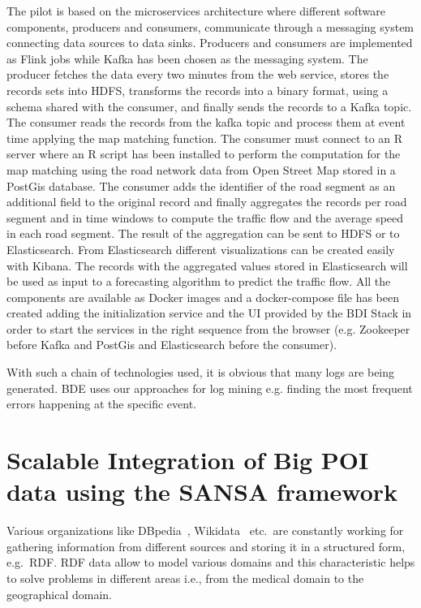 The pilot is based on the microservices architecture where different software components, producers and consumers, communicate through a messaging system connecting data sources to data sinks.
Producers and consumers are implemented as Flink jobs while Kafka has been chosen as the messaging system.
The producer fetches the data every two minutes from the web service, stores the records sets into \gls{HDFS}, transforms the records into a binary format, using a schema shared with the consumer, and finally sends the records to a Kafka topic. 
The consumer reads the records from the kafka topic and process them at event time applying the map matching function. 
The consumer must connect to an R server where an R script has been installed to perform the computation for the map matching using the road network data from Open Street Map stored in a PostGis database. 
The consumer adds the identifier of the road segment as an additional field to the original record and finally aggregates the records per road segment and in time windows to compute the traffic flow and the average speed in each road segment. 
The result of the aggregation can be sent to \gls{HDFS} or to Elasticsearch. 
From Elasticsearch different visualizations can be created easily with Kibana. 
The records with the aggregated values stored in Elasticsearch will be used as input to a forecasting algorithm to predict the traffic flow. 
All the components are available as Docker images and a docker-compose file has been created adding the initialization service and the UI provided by the BDI Stack in order to start the services in the right sequence from the browser (e.g. Zookeeper before Kafka and PostGis and Elasticsearch before the consumer).

With such a chain of technologies used, it is obvious that many logs are being generated.
BDE uses our approaches for log mining e.g. finding the most frequent errors happening at the specific event.


\section{Scalable Integration of Big POI data using the SANSA framework}
\label{sec:slipo-use-case}

Various organizations like DBpedia~\cite{dbpedia-swj}, Wikidata~\cite{Vrandecic:2014:WFC:2661061.2629489} etc.\ are constantly working for gathering information from different sources and storing it in a structured form, e.g.~\gls{RDF}.
\gls{RDF} data allow to model various domains and this characteristic helps to solve problems in different areas i.e., from the medical domain to the geographical domain. 

